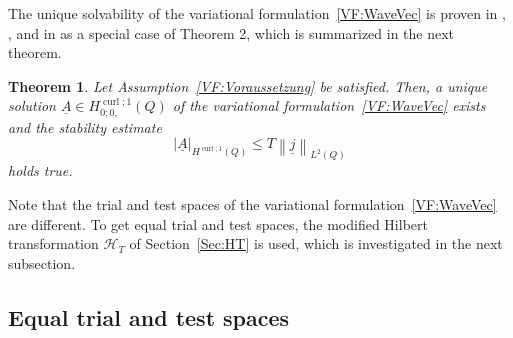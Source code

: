\documentclass[a4paper,11pt]{article}
\newtheorem{theorem}{Theorem}[section]
\newcommand{\cu}{\operatorname{curl}}
\renewcommand{\vec}[1]{\underline{#1}}
\newcommand{\abs}[1]{\left\lvert{#1}\right\rvert}
\newcommand{\norm}[1]{{\left\lVert{#1}\right\rVert}}
\begin{document}
The unique solvability of the variational formulation~\eqref{VF:WaveVec} is proven in \cite{ HauserKurzSteinbach2023}, \cite[Theorem~3.8]{HauserDiss2021}, and in \cite{HauserOhm2023} as a special case of Theorem 2, which is summarized in the next theorem.
\begin{theorem} \label{VF:Thm:Vek}
	Let Assumption~\ref{VF:Voraussetzung} be satisfied. Then, a unique solution $\vec A \in	H^{\cu;1}_{0;0,}(Q)$ of the variational formulation~\eqref{VF:WaveVec} exists and the stability estimate
	\begin{equation*}
		\abs{\vec A}_{H^{\cu;1}(Q)} \leq T \norm{\vec j}_{L^2(Q)} 
	\end{equation*}    
	holds true.
\end{theorem}
Note that the trial and test spaces of the variational formulation~\eqref{VF:WaveVec} are different. To get equal trial and test spaces, the modified Hilbert transformation $\mathcal H_T$ of Section~\ref{Sec:HT} is used, which is investigated in the next subsection.


\subsection{Equal trial and test spaces}
\end{document}
